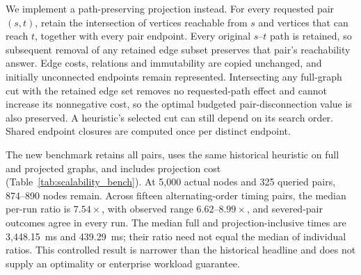 We implement a path-preserving projection instead. For every requested pair $(s,t)$, retain the intersection of vertices reachable from $s$ and vertices that can reach $t$, together with every pair endpoint. Every original $s$--$t$ path is retained, so subsequent removal of any retained edge subset preserves that pair's reachability answer. Edge costs, relations and immutability are copied unchanged, and initially unconnected endpoints remain represented. Intersecting any full-graph cut with the retained edge set removes no requested-path effect and cannot increase its nonnegative cost, so the optimal budgeted pair-disconnection value is also preserved. A heuristic's selected cut can still depend on its search order. Shared endpoint closures are computed once per distinct endpoint.

The new benchmark retains all pairs, uses the same historical heuristic on full and projected graphs, and includes projection cost (Table~\ref{tab:scalability_bench}). At 5,000 actual nodes and 325 queried pairs, 874--890 nodes remain. Across fifteen alternating-order timing pairs, the median per-run ratio is $7.54\times$, with observed range $6.62$--$8.99\times$, and severed-pair outcomes agree in every run. The median full and projection-inclusive times are 3,448.15~ms and 439.29~ms; their ratio need not equal the median of individual ratios. This controlled result is narrower than the historical headline and does not supply an optimality or enterprise workload guarantee.
